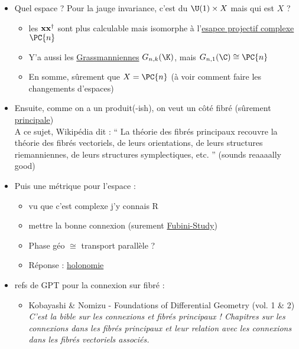 \begin{itemize}
	
	\item Quel espace ? Pour la jauge invariance, c'est du $\U(1)\times X$ mais qui est $X$ ? 
	\begin{itemize}
		\item les $\bf{x}\bf{x}^\dagger$ sont plus calculable mais isomorphe à l'\href{https://en.wikipedia.org/wiki/Complex_projective_space#Differential_geometry}{esapce projectif complexe} $\PC{n}$
		
		\item Y'a aussi les \href{https://fr.wikipedia.org/wiki/Grassmannienne}{Grassmanniennes} $G_{n,k}(\K)$, mais $G_{n, 1}(\C)\cong \PC{n}$
		
		\item En somme, sûrement que $X=\PC{n}$ (à voir comment faire les changements d'espaces)
	
	\end{itemize}
	
	\item Ensuite, comme on a un produit(-ish), on veut un côté fibré (sûrement \href{https://fr.wikipedia.org/wiki/Fibr%C3%A9_principal}{principale}) \\
	A ce sujet, Wikipédia dit : `` La théorie des fibrés principaux recouvre la théorie des fibrés vectoriels, de leurs orientations, de leurs structures riemanniennes, de leurs structures symplectiques, etc. '' (sounds reaaaally good)
	
	\item Puis une métrique pour l'espace :
	\begin{itemize}
		
		\item vu que c'est complexe j'y connais R
		
		\item mettre la bonne connexion (surement \href{https://en.wikipedia.org/wiki/Fubini%E2%80%93Study_metric}{Fubini-Study})
		
		\item Phase géo $\cong$ transport parallèle ?
		
		\item Réponse :
		 \href{https://fr.wikipedia.org/wiki/Holonomie}{holonomie}
	\end{itemize} 
	
	\item refs de GPT pour la connexion sur fibré :
	\begin{itemize}
		\item Kobayashi \& Nomizu - Foundations of Differential Geometry (vol. 1 \& 2)
		\\
		\textit{C'est la bible sur les connexions et fibrés principaux ! Chapitres sur les connexions dans les fibrés principaux et leur relation avec les connexions dans les fibrés vectoriels associés.}
		

\end{itemize}
\end{itemize}
